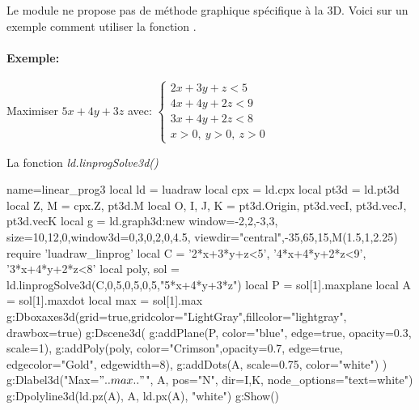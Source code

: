 Le module ne propose pas de méthode graphique spécifique à la 3D. Voici sur un exemple comment utiliser la fonction . 

\paragraph{Exemple:} Maximiser $5x+4y+3z$ avec: $\begin{cases}2x+3y+z<5\\4x+4y+2z<9\\3x+4y+2z<8\\x>0,\ y>0,\ z>0\end{cases}$

\begin{demo}{La fonction  \emph{ld.linprogSolve3d()}}
\begin{luadraw}{name=linear_prog3}
local ld = luadraw
local cpx = ld.cpx
local pt3d = ld.pt3d
local Z, M = cpx.Z, pt3d.M
local O, I, J, K = pt3d.Origin, pt3d.vecI, pt3d.vecJ, pt3d.vecK
local g = ld.graph3d:new{ window={-2,2,-3,3}, size={10,12,0},window3d={0,3,0,2,0,4.5}, 
    viewdir={"central",-35,65,15,M(1.5,1,2.25)}}
require 'luadraw_linprog'
local C = {'2*x+3*y+z<5', '4*x+4*y+2*z<9', '3*x+4*y+2*z<8'}
local poly, sol = ld.linprogSolve3d(C,0,5,0,5,0,5,{"5*x+4*y+3*z"})
local P = sol[1].maxplane
local A = sol[1].maxdot
local max = sol[1].max
g:Dboxaxes3d({grid=true,gridcolor="LightGray",fillcolor="lightgray", drawbox=true})
g:Dscene3d(
    g:addPlane(P, {color="blue", edge=true, opacity=0.3, scale=1}),
    g:addPoly(poly, {color="Crimson",opacity=0.7, edge=true, edgecolor="Gold", edgewidth=8}),
    g:addDots(A, {scale=0.75, color="white"})
    )
g:Dlabel3d("Max=$"..max.."$", A, {pos="N", dir={I,K}, node_options="text=white"})
g:Dpolyline3d({ld.pz(A), A, ld.px(A)}, "white")
g:Show()
\end{luadraw}
\end{demo}
